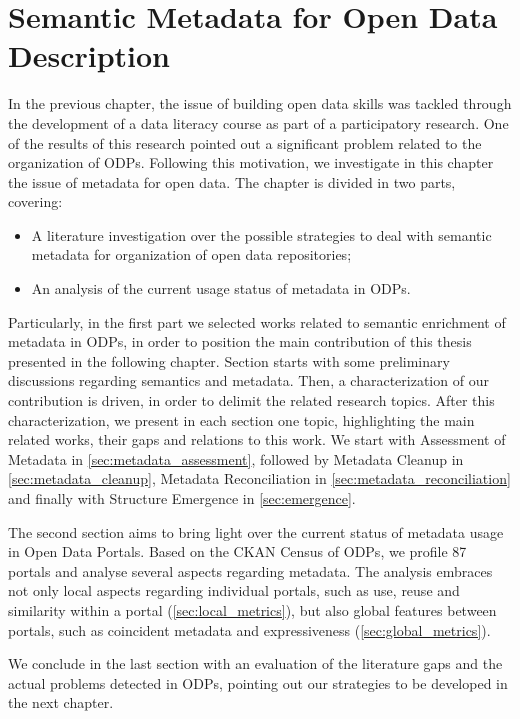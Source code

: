 \chapter{Semantic Metadata for Open Data Description}
\label{chap:relworks}

In the previous chapter, the issue of building open data skills was tackled through the development of a data literacy course as part of a participatory research.
One of the results of this research pointed out a significant problem related to the organization of ODPs.
Following this motivation, we investigate in this chapter the issue of metadata for open data. 
The chapter is divided in two parts, covering:

\begin{itemize}
	\item A literature investigation over the possible strategies to deal with semantic metadata for organization of open data repositories;
	\item An analysis of the current usage status of metadata in ODPs.
\end{itemize}

Particularly, in the first part we selected works related to semantic enrichment of metadata in ODPs, in order to position the main contribution of this thesis presented in the following chapter.
Section starts with some preliminary discussions regarding semantics and metadata.
Then, a characterization of our contribution is driven, in order to delimit the related research topics.
After this characterization, we present in each section one topic, highlighting the main related works, their gaps and relations to this work.
We start with Assessment of Metadata in \autoref{sec:metadata_assessment}, followed by Metadata Cleanup in \autoref{sec:metadata_cleanup}, Metadata Reconciliation in \autoref{sec:metadata_reconciliation} and finally with Structure Emergence in \autoref{sec:emergence}.

The second section aims to bring light over the current status of metadata usage in Open Data Portals.
Based on the CKAN Census of ODPs, we profile 87 portals and analyse several aspects regarding metadata.
The analysis embraces not only local aspects regarding individual portals, such as use, reuse and similarity within a portal (\autoref{sec:local_metrics}), but also global features between portals, such as coincident metadata and expressiveness (\autoref{sec:global_metrics}).

We conclude in the last section with an evaluation of the literature gaps and the actual problems detected in ODPs, pointing out our strategies to be developed in the next chapter.

